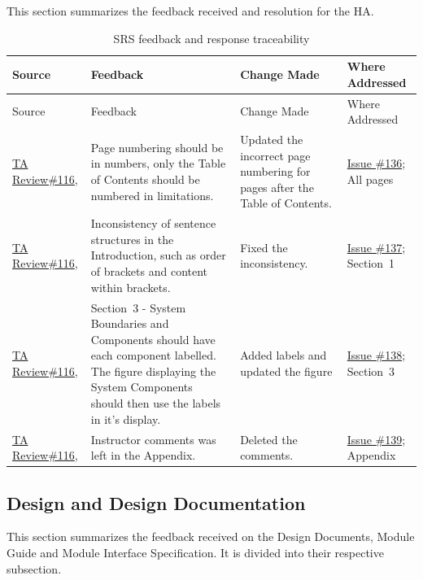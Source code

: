 \documentclass{article}
\begin{document}
   This section summarizes the feedback received and resolution for the HA.
    \begin{longtable}{p{} p{}
                    p{} p{}}
    \caption{SRS feedback and response traceability}
    \label{tab:srs-trace}\\
    \toprule
    Source & Feedback & Change Made & Where Addressed \\
    \midrule
    \endfirsthead

    \toprule
    Source & Feedback & Change Made & Where Addressed \\
    \midrule
    \endhead

    \bottomrule
    \endfoot

    \href{https://github.com/thaafei/DomainX/issues/116}{TA Review\#116},
    &
    Page numbering should be in numbers, only the Table of Contents should be numbered in limitations.
    &
    Updated the incorrect page numbering for pages after the Table of Contents.
    &
    \href{https://github.com/thaafei/DomainX/issues/136}{Issue \#136}; All pages
    \\

    \href{https://github.com/thaafei/DomainX/issues/116}{TA Review\#116},
    &
    Inconsistency of sentence structures in the Introduction, such as order of brackets and content within brackets.
    &
    Fixed the inconsistency.
    &
    \href{https://github.com/thaafei/DomainX/issues/137}{Issue \#137}; Section~1
    \\

    \href{https://github.com/thaafei/DomainX/issues/116}{TA Review\#116},
    &
    Section~3 - System Boundaries and Components should have each component labelled. The figure displaying the System Components should then use the labels in it's display.
    &
    Added labels and updated the figure
    &
    \href{https://github.com/thaafei/DomainX/issues/138}{Issue \#138}; Section~3
    \\

    \href{https://github.com/thaafei/DomainX/issues/116}{TA Review\#116},
    &
    Instructor comments was left in the Appendix.
    &
    Deleted the comments.
    &
    \href{https://github.com/thaafei/DomainX/issues/138}{Issue \#139}; Appendix
    \\
    \end{longtable}

\subsection{Design and Design Documentation}
This section summarizes the feedback received on the Design Documents, Module Guide and Module Interface Specification. It is divided into their respective subsection.
\end{document}
